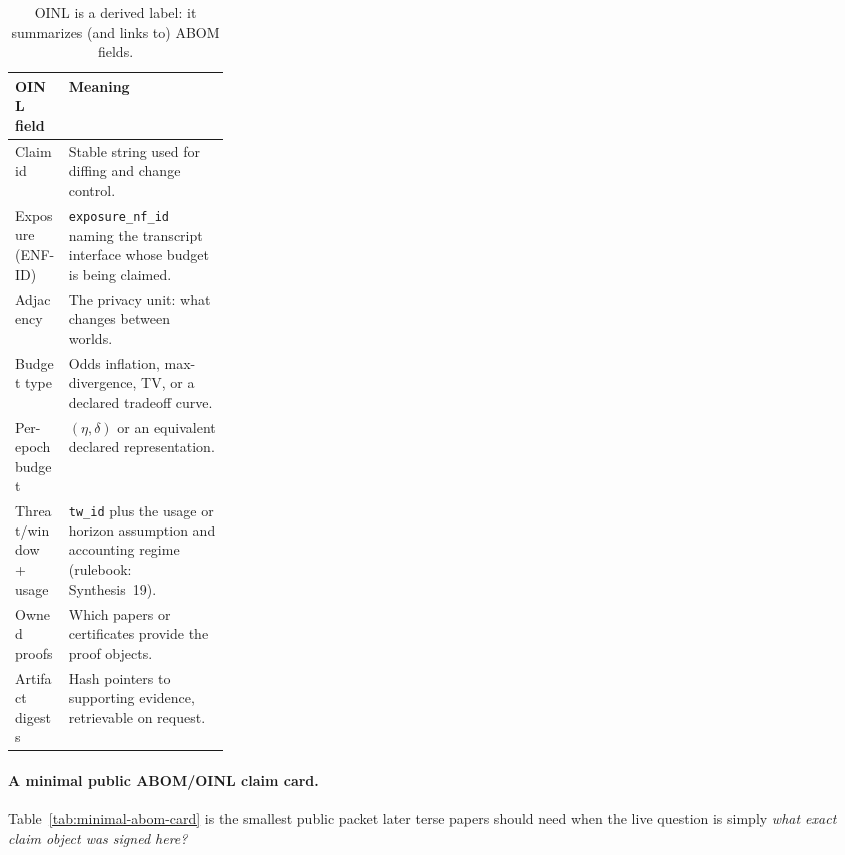 \documentclass[11pt]{article}
\begin{document}
\begin{table}[t]
\centering
\small
\begin{tabularx}{0.97\linewidth}{@{}p{0.25\linewidth}X@{}}
\toprule
\textbf{OINL field} & \textbf{Meaning}\\
\midrule
Claim id & Stable string used for diffing and change control. \\
Exposure (ENF-ID) & \texttt{exposure\_nf\_id} naming the transcript interface whose budget is being claimed. \\
Adjacency & The privacy unit: what changes between worlds. \\
Budget type & Odds inflation, max-divergence, TV, or a declared tradeoff curve. \\
Per-epoch budget & $(\eta,\delta)$ or an equivalent declared representation. \\
Threat/window + usage & \texttt{tw\_id} plus the usage or horizon assumption and accounting regime (rulebook: Synthesis~19). \\
Owned proofs & Which papers or certificates provide the proof objects. \\
Artifact digests & Hash pointers to supporting evidence, retrievable on request. \\
\bottomrule
\end{tabularx}
\caption{OINL is a derived label: it summarizes (and links to) ABOM fields.}
\end{table}

\paragraph{A minimal public ABOM/OINL claim card.}
Table~\ref{tab:minimal-abom-card} is the smallest public packet later terse papers should need when the live question is simply \emph{what exact claim object was signed here?}
\end{document}
